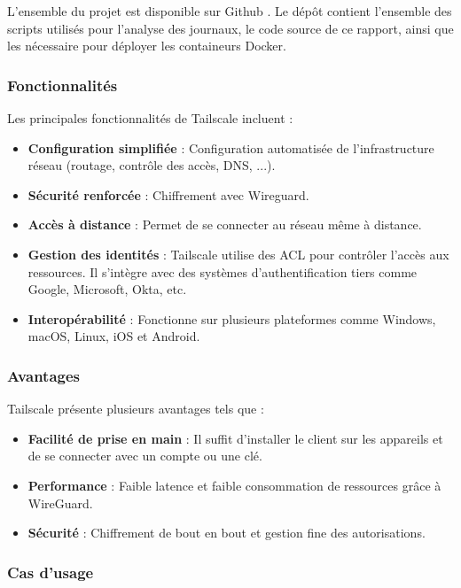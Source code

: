 \documentclass[12pt,letterpaper]{article}
\begin{document}
L'ensemble du projet est disponible sur Github \cite{EgourvesInf808prINF808a}.
Le dépôt contient l'ensemble des scripts utilisés pour l'analyse des journaux, le code source de ce rapport, ainsi que les nécessaire pour déployer les containeurs Docker.

\subsubsection{Fonctionnalités}

Les principales fonctionnalités de Tailscale incluent :
\begin{itemize}
    \item \textbf{Configuration simplifiée} : Configuration automatisée de l'infrastructure réseau (routage, contrôle des accès, DNS, ...).
    \item \textbf{Sécurité renforcée} : Chiffrement avec Wireguard.
    \item \textbf{Accès à distance} : Permet de se connecter au réseau même à distance.
    \item \textbf{Gestion des identités} : Tailscale utilise des ACL pour contrôler l'accès aux ressources. Il s'intègre avec des systèmes d'authentification tiers comme Google, Microsoft, Okta, etc.
    \item \textbf{Interopérabilité} : Fonctionne sur plusieurs plateformes comme Windows, macOS, Linux, iOS et Android.
\end{itemize}

\subsubsection{Avantages}

Tailscale présente plusieurs avantages tels que :
\begin{itemize}
    \item \textbf{Facilité de prise en main} : Il suffit d'installer le client sur les appareils et de se connecter avec un compte ou une clé.
    \item \textbf{Performance} : Faible latence et faible consommation de ressources grâce à WireGuard.
    \item \textbf{Sécurité} : Chiffrement de bout en bout et gestion fine des autorisations.
\end{itemize}

\subsubsection{Cas d'usage}
\end{document}
